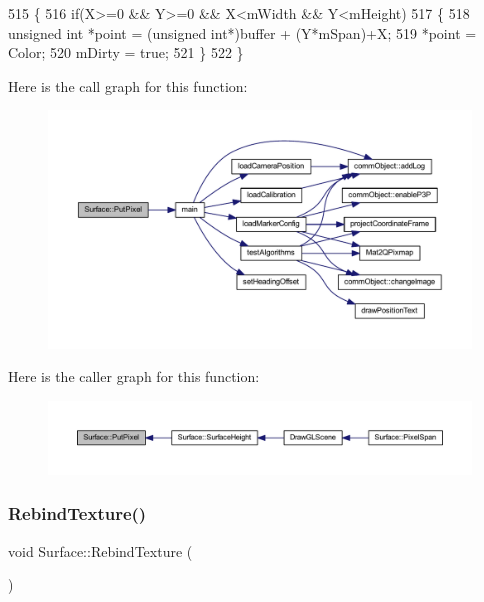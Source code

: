 \begin{DoxyCode}
515 \{
516     \textcolor{keywordflow}{if}(X>=0 && Y>=0 && X<mWidth && Y<mHeight)
517     \{
518         \textcolor{keywordtype}{unsigned} \textcolor{keywordtype}{int} *point = (\textcolor{keywordtype}{unsigned} \textcolor{keywordtype}{int}*)buffer + (Y*mSpan)+X;
519         *point = Color;
520         mDirty = \textcolor{keyword}{true};
521     \}
522 \}
\end{DoxyCode}
Here is the call graph for this function\+:\nopagebreak
\begin{figure}[H]
\begin{center}
\leavevmode
\includegraphics[width=350pt]{class_surface_a728571d0386e9690ce1760931562c72b_cgraph}
\end{center}
\end{figure}
Here is the caller graph for this function\+:\nopagebreak
\begin{figure}[H]
\begin{center}
\leavevmode
\includegraphics[width=350pt]{class_surface_a728571d0386e9690ce1760931562c72b_icgraph}
\end{center}
\end{figure}
\mbox{\label{class_surface_aa75c49f53fec5c49ba8422c0d64815e6}} 
\subsubsection{\texorpdfstring{Rebind\+Texture()}{RebindTexture()}}
{\footnotesize\ttfamily void Surface\+::\+Rebind\+Texture (\begin{DoxyParamCaption}{ }\end{DoxyParamCaption})}



